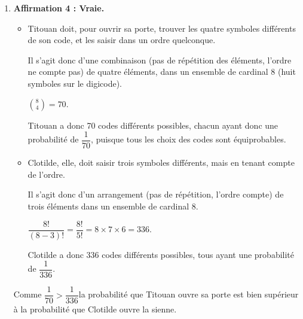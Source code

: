 \documentclass[10pt]{article}
\providecommand{\vectt}[1]{\overrightarrow{\mathrm{#1}}}
\providecommand{\ds}{\displaystyle}
\begin{document}
\begin{enumerate}
\begin{enumerate}
			En utilisant la définition trigonométrique du produit scalaire, on a :

			$\vectt{CA}\cdot\vectt{CB} = \mathrm{CA} \times \mathrm{CB} \times \cos\left(\widehat{\mathrm{ACB}}\right)$.

			En remplaçant les valeurs connues, on a :\quad $6,75 = 4,5 \times 4,5 \times \cos\left(\widehat{\mathrm{ACB}}\right)$,

			ce qui équivaut à \quad $\cos\left(\widehat{\mathrm{ACB}}\right) = \dfrac{6,75}{4,5^2} = \dfrac{1}{3}$.

			On en déduit :\quad $\widehat{\mathrm{ACB}} = \arccos\left(\dfrac{1}{3}\right) \approx 70,53$\,\textdegree.

			On a donc bien $\widehat{\mathrm{ACB}} \approx 70,5$\,\textdegree, à $10^{-1}$ près.
		\end{enumerate}

		\item \textbf{Affirmation 4 : Vraie.}

		\begin{itemize}[label=\textbullet~]
			\item Titouan doit, pour ouvrir sa porte, trouver les quatre symboles différents de son code, et les saisir dans un ordre quelconque.

			Il s'agit donc d'une combinaison (pas de répétition des éléments, l'ordre ne compte pas) de quatre éléments, dans un ensemble de cardinal 8 (huit symboles sur le digicode).

			$\ds \binom{8}{4} = 70$.

			Titouan a donc 70 codes différents possibles, chacun ayant donc une probabilité de $\dfrac{1}{70}$, puisque tous les choix des codes sont équiprobables.
			\item Clotilde, elle, doit saisir trois symboles différents, mais en tenant compte de l'ordre.

			Il s'agit donc d'un arrangement (pas de répétition, l'ordre compte) de trois éléments dans un ensemble de cardinal 8.

			$ \dfrac{8!}{(8-3)!} = \dfrac{8!}{5!} = 8\times 7 \times 6 = 336$.

			Clotilde a donc 336 codes différents possibles, tous ayant une probabilité de $\dfrac{1}{336}$.
		\end{itemize}

		Comme \quad $\dfrac{1}{70} > \dfrac{1}{336}$\quad la probabilité que Titouan ouvre sa porte est bien supérieur à la probabilité que Clotilde ouvre la sienne.
	\end{enumerate}
\end{document}
